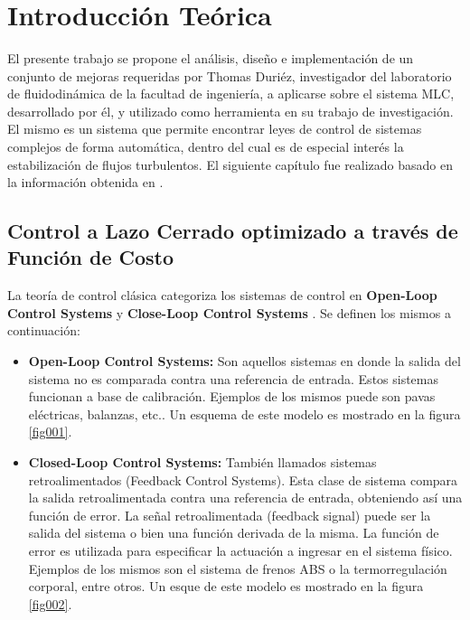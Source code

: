 \documentclass[a4paper,10pt]{article}
\title{  }
\begin{document}
	\maketitle %
	\newpage

	\tableofcontents
	\newpage

    \section{Introducción Teórica} \label{sec:intro}
        El presente trabajo se propone el análisis, diseño e implementación de un conjunto de mejoras requeridas por Thomas Duriéz,
        investigador del laboratorio de fluidodinámica de la facultad de ingeniería, a aplicarse sobre el sistema MLC, desarrollado por él,
        y utilizado como herramienta en su trabajo de investigación. El mismo es un sistema que permite encontrar leyes de control de 
        sistemas complejos de forma automática, dentro del cual es de especial interés la estabilización de flujos turbulentos.
        El siguiente capítulo fue realizado basado en la información obtenida en \cite{Duriez2016}.

        \subsection{Control a Lazo Cerrado optimizado a través de Función de Costo} \label{sec:close_loop}
        La teoría de control clásica categoriza los sistemas de control en \textbf{Open-Loop Control Systems} y
        \textbf{Close-Loop Control Systems} \cite{Ogata2002}. Se definen los mismos a continuación:

        \begin{itemize}
            \item \textbf{Open-Loop Control Systems:} Son aquellos sistemas en donde la salida del sistema no es comparada contra una
            referencia de entrada. Estos sistemas funcionan a base de calibración. Ejemplos de los mismos puede son pavas eléctricas,
            balanzas, etc.. Un esquema de este modelo es mostrado en la figura \ref{fig001}.
            \item \textbf{Closed-Loop Control Systems:} También llamados sistemas retroalimentados (Feedback Control Systems). Esta clase
            de sistema compara la salida retroalimentada contra una referencia de entrada, obteniendo así una función de error. La señal
            retroalimentada (feedback signal) puede ser la salida del sistema o bien una función derivada de la misma. La función de error
            es utilizada para especificar la actuación a ingresar en el sistema físico. Ejemplos de los mismos son el sistema de frenos
            ABS o la termorregulación corporal, entre otros. Un esque de este modelo es mostrado en la figura \ref{fig002}.
        \end{itemize}
\end{document}
